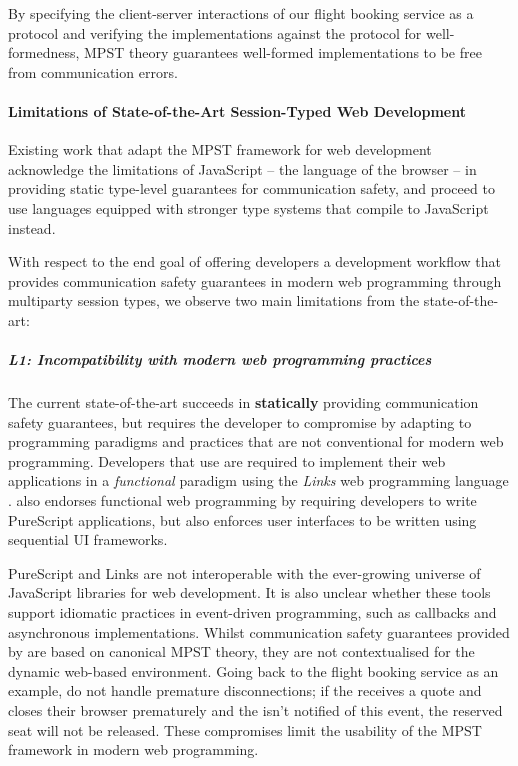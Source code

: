 By specifying the client-server interactions of 
our flight booking service as a protocol 
and verifying the implementations against 
the protocol for well-formedness, 
MPST theory guarantees well-formed 
implementations to be free from communication errors.

\paragraph{Limitations of State-of-the-Art Session-Typed Web Development}
Existing work \cite{MVU2020,PureScript2019} that 
adapt the MPST framework for web development
acknowledge the limitations of JavaScript 
-- the language of the browser --
in providing static type-level guarantees
for communication safety, 
and proceed to use
languages equipped with stronger type systems that 
compile to JavaScript instead.

With respect to the end goal of 
offering developers a development workflow
that provides communication safety guarantees in modern
web programming through multiparty session types,
we observe two main limitations from the state-of-the-art:

\subparagraph{L1: 
Incompatibility with modern web programming practices}

The current state-of-the-art succeeds in \textbf{statically}
providing communication safety guarantees,
but requires the developer to compromise by adapting
to programming paradigms and practices that are not
conventional for modern web programming.
Developers that use \cite{MVU2020} are required
to implement their web applications in a \textit{functional} 
paradigm using the \textit{Links} 
web programming language \cite{LINKS}.
\cite{PureScript2019} also endorses
functional web programming by requiring developers to
write PureScript \cite{PureScript} applications, but also
enforces user interfaces to be written using 
sequential UI frameworks.

PureScript and Links are not interoperable
with the ever-growing universe of JavaScript libraries for
web development.
It is also unclear whether these tools support idiomatic
practices in event-driven programming, such as callbacks
and asynchronous implementations.
Whilst communication safety guarantees provided by
\cite{PureScript2019,MVU2020} are based on
canonical MPST theory, they are not contextualised
for the dynamic web-based environment.
Going back to the flight booking service as an example,
\cite{PureScript2019,MVU2020} do not handle premature
disconnections; if the  receives a quote
and closes their browser prematurely and the 
isn't notified of this event, 
the reserved seat will not be released.
These compromises limit the usability of the MPST framework
in modern web programming.


